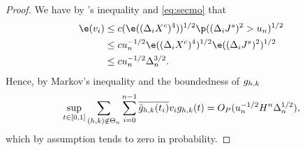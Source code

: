 \begin{proof}
\begin{comment}
    \begin{align}
      \p &\left(  \sup_{t \in \domain}\vert x_n (t) \vert  > \delta\right) \le \p(v_n > \delta/2) + \p(w_n > \delta/2) \notag. 
      \label{}
    \end{align}
  Now let  $\varepsilon > 0$ be given and note that because  $\Lambda$ is almost surely finite,   there is a sufficiently large $K > 0$ such that $\p(\Lambda > K) \le \varepsilon/2$. Hence, 
\end{comment}
We have by \holder's inequality and \eqref{eq:secmo} that
\begin{align} 
  \e(v_i) & \le c (\e( (\dxc)^4))^{1/2} \p( (\djt)^2 > u_n)^{1/2} \notag \\ 
  & \le c u_n^{-1/2} \e( (\dxc)^4)^{1/2} \e( (\djt)^2)^{1/2} \notag \\ 
  & \le c u_n^{-1/2}\Delta_n^{3/2} \label{eq:vi}.
\end{align}
Hence,  by Markov's inequality and the boundedness of $g_{h,k}$ \begin{align} \sup_{t \in [0,1]}\sum_{(h,k) \not\in \Theta_n} \sum_{i = 0}^{n-1} \overline{\tilde{g}_{h,k}(t_i)} v_i g_{h,k}(t) = O_P(u_n^{-1/2}H^n \Delta_n^{1/2}),\end{align} 
which by assumption tends to zero in probability.


\end{proof}
